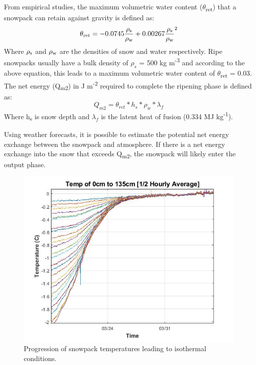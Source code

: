 From empirical studies, the maximum volumetric water content ($\theta$\textsubscript{ret}) that a snowpack can retain against gravity is defined as: 
\begin{equation}
\theta \textsubscript{ret} = -0.0745\frac{\rho \textsubscript{s}}{\rho \textsubscript{w}}
+ 0.00267\frac{\rho \textsubscript{s}}{\rho \textsubscript{w}}^2 
\end{equation}
Where $\rho \textsubscript{s}$ and $\rho \textsubscript{w}$ are the densities of snow and water respectively. Ripe snowpacks usually have a bulk density of $\rho_s$ = 500 kg m\textsuperscript{-3} and according to the above equation, this leads to a maximum volumetric water content of $\theta$\textsubscript{ret} = 0.03. The net energy (Q\textsubscript{m2}) in J m\textsuperscript{-2} required to complete the ripening phase is defined as: 
\begin{equation}
Q_{m2} = \theta_{ret} * h_s * \rho_w * \lambda_f
\end{equation}
Where h\textsubscript{s} is snow depth and $\lambda_f$ is the latent heat of fusion (0.334 MJ kg\textsuperscript{-1}). 

Using weather forecasts, it is possible to estimate the potential net energy exchange between the snowpack and atmosphere. If there is a net energy exchange into the snow that exceeds Q\textsubscript{m2}, the snowpack will likely enter the output phase.  

\begin{figure}
    \centering
    \includegraphics[width=0.7\linewidth]{figures/0_135cm_Isothermal.jpg}
    \caption{Progression of snowpack temperatures leading to isothermal conditions.}
    \label{fig:0_135cm_Isothermal}
 \end{figure}
 
